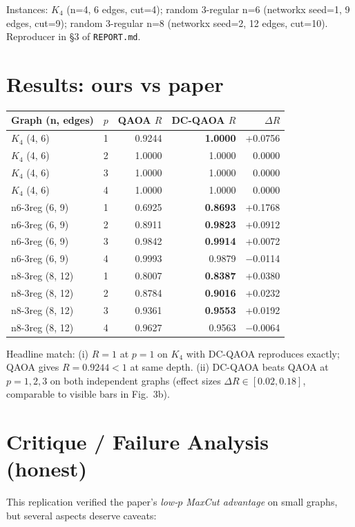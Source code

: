 \documentclass[11pt]{article}
\begin{document}
Instances: $K_4$ (n=4, 6 edges, cut=4); random 3-regular n=6 (networkx seed=1, 9 edges, cut=9); random 3-regular n=8 (networkx seed=2, 12 edges, cut=10). Reproducer in \S3 of \texttt{REPORT.md}.

\section{Results: ours vs paper}
\begin{center}
\small
\begin{tabular}{lrrrr}
\toprule
Graph (n, edges) & $p$ & QAOA $R$ & DC-QAOA $R$ & $\Delta R$ \\
\midrule
$K_4$ (4, 6) & 1 & 0.9244 & \textbf{1.0000} & +0.0756 \\
$K_4$ (4, 6) & 2 & 1.0000 & 1.0000 & 0.0000 \\
$K_4$ (4, 6) & 3 & 1.0000 & 1.0000 & 0.0000 \\
$K_4$ (4, 6) & 4 & 1.0000 & 1.0000 & 0.0000 \\
n6-3reg (6, 9) & 1 & 0.6925 & \textbf{0.8693} & +0.1768 \\
n6-3reg (6, 9) & 2 & 0.8911 & \textbf{0.9823} & +0.0912 \\
n6-3reg (6, 9) & 3 & 0.9842 & \textbf{0.9914} & +0.0072 \\
n6-3reg (6, 9) & 4 & 0.9993 & 0.9879 & $-$0.0114 \\
n8-3reg (8, 12) & 1 & 0.8007 & \textbf{0.8387} & +0.0380 \\
n8-3reg (8, 12) & 2 & 0.8784 & \textbf{0.9016} & +0.0232 \\
n8-3reg (8, 12) & 3 & 0.9361 & \textbf{0.9553} & +0.0192 \\
n8-3reg (8, 12) & 4 & 0.9627 & 0.9563 & $-$0.0064 \\
\bottomrule
\end{tabular}
\end{center}

Headline match: (i) $R=1$ at $p=1$ on $K_4$ with DC-QAOA reproduces exactly; QAOA gives $R=0.9244<1$ at same depth. (ii) DC-QAOA beats QAOA at $p=1,2,3$ on both independent graphs (effect sizes $\Delta R \in [0.02, 0.18]$, comparable to visible bars in Fig.~3b).

\section{Critique / Failure Analysis (honest)}
\label{sec:critique}
This replication verified the paper's \emph{low-$p$ MaxCut advantage} on small graphs, but several aspects deserve caveats:
\end{document}
